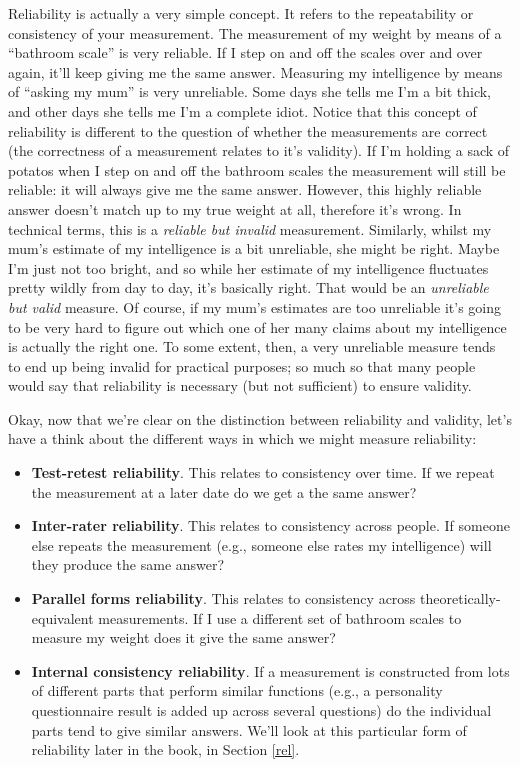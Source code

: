 \documentclass[
]{book}
\providecommand{\tightlist}{%
  \setlength{\itemsep}{0pt}\setlength{\parskip}{0pt}}
\begin{document}
Reliability is actually a very simple concept. It refers to the repeatability or consistency of your measurement. The measurement of my weight by means of a ``bathroom scale'' is very reliable. If I step on and off the scales over and over again, it'll keep giving me the same answer. Measuring my intelligence by means of ``asking my mum'' is very unreliable. Some days she tells me I'm a bit thick, and other days she tells me I'm a complete idiot. Notice that this concept of reliability is different to the question of whether the measurements are correct (the correctness of a measurement relates to it's validity). If I'm holding a sack of potatos when I step on and off the bathroom scales the measurement will still be reliable: it will always give me the same answer. However, this highly reliable answer doesn't match up to my true weight at all, therefore it's wrong. In technical terms, this is a \emph{reliable but invalid} measurement. Similarly, whilst my mum's estimate of my intelligence is a bit unreliable, she might be right. Maybe I'm just not too bright, and so while her estimate of my intelligence fluctuates pretty wildly from day to day, it's basically right. That would be an \emph{unreliable but valid} measure. Of course, if my mum's estimates are too unreliable it's going to be very hard to figure out which one of her many claims about my intelligence is actually the right one. To some extent, then, a very unreliable measure tends to end up being invalid for practical purposes; so much so that many people would say that reliability is necessary (but not sufficient) to ensure validity.

Okay, now that we're clear on the distinction between reliability and validity, let's have a think about the different ways in which we might measure reliability:

\begin{itemize}
\tightlist
\item
  {\textbf{Test-retest reliability}}. This relates to consistency over time. If we repeat the measurement at a later date do we get a the same answer?
\item
  {\textbf{Inter-rater reliability}}. This relates to consistency across people. If someone else repeats the measurement (e.g., someone else rates my intelligence) will they produce the same answer?
\item
  {\textbf{Parallel forms reliability}}. This relates to consistency across theoretically-equivalent measurements. If I use a different set of bathroom scales to measure my weight does it give the same answer?
\item
  {\textbf{Internal consistency reliability}}. If a measurement is constructed from lots of different parts that perform similar functions (e.g., a personality questionnaire result is added up across several questions) do the individual parts tend to give similar answers. We'll look at this particular form of reliability later in the book, in Section \ref{rel}.
\end{itemize}
\end{document}
